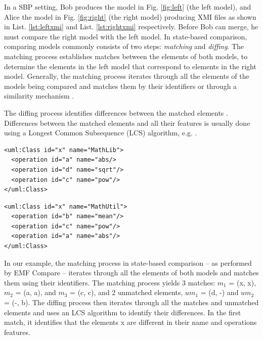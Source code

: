 \documentclass{jot}
\begin{document}
In a SBP setting, Bob produces the model in Fig. \ref{fig:left} (the left model), and Alice the model in Fig. \ref{fig:right} (the right model) producing XMI files as shown in List. \ref{lst:leftxmi} and List. \ref{lst:rightxmi} respectively.
Before Bob can merge, he must compare the right model with the left model.
In state-based comparison, comparing models commonly consists of two steps: \emph{matching} and \emph{diffing}.
The matching process establishes matches between the elements of both models, to determine the elements in the left model that correspond to elements in the right model.
Generally, the matching process iterates through all the elements of the models being compared and matches them by their identifiers or through a similarity mechanism  \cite{DBLP:conf/sfm/BroschKLSWW12,emfcompare2018developer}.

The diffing process identifies differences between the matched elements \cite{DBLP:conf/sfm/BroschKLSWW12,emfcompare2018developer}.
Differences between the matched elements and all their features is usually done using a Longest Common Subsequence (LCS) algorithm, e.g. \cite{DBLP:journals/algorithmica/Meyers86}.

\vspace{-10pt}
\begin{minipage}[t]{0.49\linewidth} 
\begin{lstlisting}[style=eol,caption={The simplified XMI of the left model in Fig. \ref{fig:left}.},label=lst:leftxmi]
<uml:Class id="x" name="MathLib">
  <operation id="a" name="abs/>
  <operation id="d" name="sqrt"/>
  <operation id="c" name="pow"/>
</uml:Class>
\end{lstlisting}
\end{minipage}
\hfill
\begin{minipage}[t]{0.49\linewidth}
\begin{lstlisting}[style=eol,caption={The simplified XMI of the right model in Fig. \ref{fig:right}.},label=lst:rightxmi]
<uml:Class id="x" name="MathUtil">
  <operation id="b" name="mean"/>
  <operation id="c" name="pow"/>
  <operation id="a" name="abs"/>
</uml:Class>
\end{lstlisting}
\end{minipage}

In our example, the matching process in state-based comparison -- as performed by EMF Compare \cite{emfcompare2018developer} -- iterates through all the elements of both models and matches them using their identifiers. The matching process yields 3 matches: $m_1$ = (\textsf{x}, \textsf{x}), $m_2$ = (\textsf{a}, \textsf{a}), and $m_3$ = (\textsf{c}, \textsf{c}), and 2 unmatched elements, $um_1$ = (\textsf{d}, -) and $um_2$ = (-, \textsf{b}). The diffing process then iterates through all the matches and unmatched elements and uses an LCS algorithm to identify their differences. In the first match, it identifies that the elements \textsf{x} are different in their \textsf{name} and \textsf{operations} features. 
\end{document}
